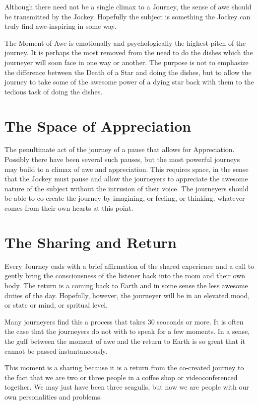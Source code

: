 \documentclass[12pt]{book}
\begin{document}
Although there need not be a single climax to a Journey,
the sense of awe should be transmitted by the Jockey.
Hopefully the subject is something the Jockey can
truly find awe-inspiring in some way.

The Moment of Awe is emotionally and psychologically
the highest pitch of the journey. It is perhaps the
most removed from the need to do the dishes which the
journeyer will soon face in one way or another. The purpose
is not to emphasize the difference between the Death of a
Star and doing the dishes, but to allow the journey to take
some of the awesome power of a dying star back with them
to the tedious task of doing the dishes.

\section{ The Space of Appreciation}

The penultimate act of the journey of a pause that
allows for Appreciation.  Possibly there have been several
such pauses, but the most powerful journeys may build to
a climax of awe and appreciation. This requires space,
in the sense that the Jockey must pause and allow the
journeyers to appreciate the awesome nature of the subject
without the intrusion of their voice.  The journeyers
should be able to co-create the journey by imagining,
or feeling, or thinking, whatever comes from their own
hearts at this point.


\section{ The Sharing and Return}

Every Journey ends with a brief affirmation of the
shared experience and a call to gently bring the consciousness
of the listener back into the room and their own body.
The return is a coming back to Earth and in some sense
the less awesome duties of the day. Hopefully, however, the
journeyer will be in an elevated mood, or state or mind,
or spritual level.

Many journeyers find this a process that takes 30 seoconds
or more. It is often the case that the journeyers do not
with to speak for a few moments. In a sense, the gulf
between the moment of awe and the return to Earth is
so great that it cannot be passed instantaneously.

This moment is a sharing because it is a return from the
co-created journey to the fact that we are two or three
people in a coffee shop or videoconferenced together.
We may just have been three seagulls, but now we are
people with our own personalities and problems.
\end{document}
